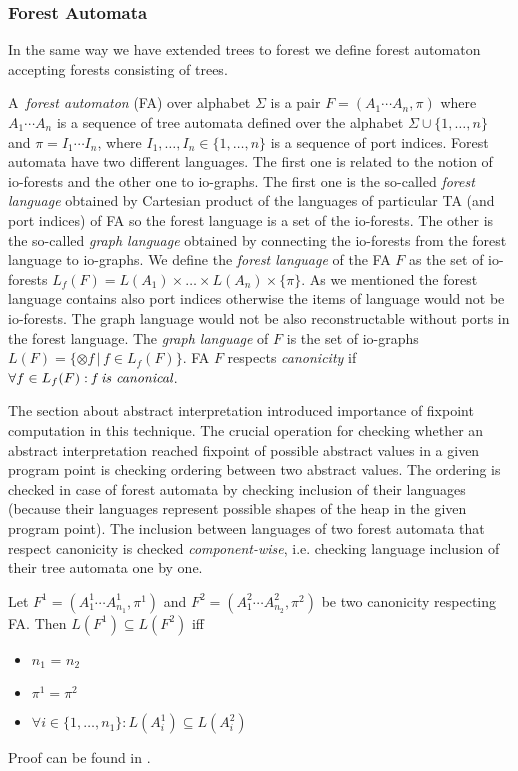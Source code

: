\documentclass[a4paper, 12pt]{article}
\begin{document}
\subsubsection{Forest Automata}
\label{subsec:fa}

In the same way we have extended trees to forest we define forest automaton
accepting forests consisting of trees.

A~\emph{forest automaton} (FA) over alphabet $\Sigma$ is a pair $F=(A_1\cdots A_n, \pi)$
where $A_1 \cdots A_n$ is a sequence of tree automata defined over the alphabet $\Sigma \cup \{1,\ldots,n\}$
and $\pi = I_1 \cdots I_n$, where $I_1,\ldots, I_n \in \{1, \ldots, n\}$ is a sequence of port indices.
Forest automata have two different languages.
The first one is related to the notion of io-forests and the other one to io-graphs.
The first one is the so-called \emph{forest language} obtained by Cartesian product of the languages of particular TA (and port indices) of FA
so the forest language is a set of the io-forests.
The other is the so-called \emph{graph language} obtained by connecting the io-forests from the forest language to io-graphs.
We define the \emph{forest language} of the FA $F$ as the set of io-forests $L_f(F)= L(A_1) \times \ldots \times L(A_n) \times \{\pi\}$.
As we mentioned the forest language contains also port indices otherwise the items of language would not be io-forests.
The graph language would not be also reconstructable without ports in the forest language.
The \emph{graph language} of $F$ is the set of io-graphs $L(F) = \{\otimes f\,|\, f \in L_f(F)\}$.
FA $F$ respects \emph{canonicity} if $\forall f \in L_f(F): \emph{f is canonical}$.

The section about abstract interpretation introduced importance of fixpoint
computation in this technique.
The crucial operation for checking whether an abstract interpretation
reached fixpoint of possible abstract values in a given program point is
checking ordering between two abstract values.
The ordering is checked in case of forest automata by checking
inclusion of their languages (because their languages represent
possible shapes of the heap in the given program point).
The inclusion between languages of two forest automata that respect canonicity 
is checked \emph{component-wise},
i.e. checking language inclusion of their tree automata one by one.

\begin{lemma}
	Let $F^1 = (A_1^1\cdots A_{n_{1}}^1, \pi^1)$ and $F^2 = (A_1^2\cdots A_{n_{2}}^2, \pi^2)$
	be two canonicity respecting FA.
	Then $L(F^1) \subseteq L(F^2)$ iff
	\begin{itemize}
			\item $n_1$ = $n_2$
			\item $\pi^1 = \pi^2$
			\item $\forall i \in \{1,\ldots,n_1\}: L(A_i^1) \subseteq L(A_i^2)$
	\end{itemize}
\end{lemma}
Proof can be found in \cite{forester:techrep}.
\end{document}
